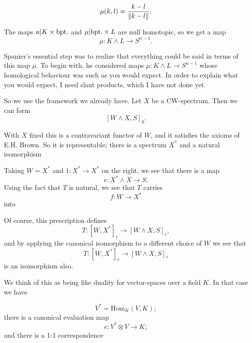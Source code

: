 \documentclass[../main]{subfiles}
\begin{document}
\begin{equation*}
    \mu(k,l)=\frac{k-l}{\lVert k-l\rVert}.
\end{equation*}

The maps $u\vert K\times\mathrm{bpt.}$ and $\mu\vert\mathrm{bpt.}\times L$ are null homotopic, so we get a map \[\mu\colon K\wedge L\longrightarrow S^{n-1}.\]

Spanier's essential step was to realize that everything could be said in terms of this map $\mu$. To begin with, he considered maps $\mu\colon K\wedge L\longrightarrow S^{n-1}$ whose homological behaviour was such as you would expect. In order to explain what you would expect, I need slant products, which I have not done yet.

So we use the framework we already have. Let $X$ be a CW-spectrum. Then we can form \[[W\wedge X,S]_0.\]

With $X$ fixed this is a contravariant functor of $W$, and it satisfies the axioms of E.H. Brown. So it is representable; there is a spectrum $X^{\ast}$ and a natural isomorphism 
\begin{center}
\end{center}
Taking $W=X^{\ast}$ and $1\colon X^{\ast}\longrightarrow X^{\ast}$ on the right, we see that there is a map \[e\colon X^{\ast}\wedge X\longrightarrow S.\]Using the fact that $T$ is natural, we see that $T$ carries \[f\colon W\longrightarrow X^{\ast}\]into

\begin{center}
\end{center}
Of course, this prescription defines \[T\colon [W,X^{\ast}]_r\longrightarrow[W\wedge X,S]_r,\]and by applying the canonical isomorphism to a different choice of $W$ we see that \[T\colon [W,X^{\ast}]_r\longrightarrow[W\wedge X,S]_r\]is an isomorphism also.

We think of this as being like duality for vector-spaces over a field $K$. In that case we have 

\begin{equation*}
    V^{\ast}=\mathrm{Hom}_K(V,K);
\end{equation*}
there is a canonical evaluation map \[e\colon V^{\ast}\otimes V\longrightarrow K;\]
and there is a 1-1 correspondence 
\begin{center}
\end{center}
\end{document}
